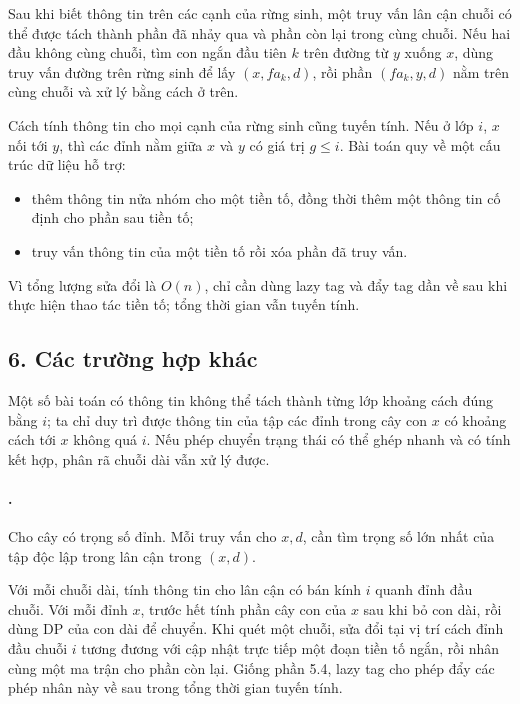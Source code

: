 \documentclass[11pt]{article}
\begin{document}
Sau khi biết thông tin trên các cạnh của rừng sinh, một truy vấn lân cận chuỗi
có thể được tách thành phần đã nhảy qua và phần còn lại trong cùng chuỗi. Nếu
hai đầu không cùng chuỗi, tìm con ngắn đầu tiên \(k\) trên đường từ \(y\) xuống
\(x\), dùng truy vấn đường trên rừng sinh để lấy \((x,fa_k,d)\), rồi phần
\((fa_k,y,d)\) nằm trên cùng chuỗi và xử lý bằng cách ở trên.

Cách tính thông tin cho mọi cạnh của rừng sinh cũng tuyến tính. Nếu ở lớp
\(i\), \(x\) nối tới \(y\), thì các đỉnh nằm giữa \(x\) và \(y\) có giá trị
\(g\le i\). Bài toán quy về một cấu trúc dữ liệu hỗ trợ:
\begin{itemize}
  \item thêm thông tin nửa nhóm cho một tiền tố, đồng thời thêm một thông tin
  cố định cho phần sau tiền tố;
  \item truy vấn thông tin của một tiền tố rồi xóa phần đã truy vấn.
\end{itemize}
Vì tổng lượng sửa đổi là \(O(n)\), chỉ cần dùng lazy tag và đẩy tag dần về sau
khi thực hiện thao tác tiền tố; tổng thời gian vẫn tuyến tính.

\subsection*{6. Các trường hợp khác}

Một số bài toán có thông tin không thể tách thành từng lớp khoảng cách đúng
bằng \(i\); ta chỉ duy trì được thông tin của tập các đỉnh trong cây con \(x\)
có khoảng cách tới \(x\) không quá \(i\). Nếu phép chuyển trạng thái có thể
ghép nhanh và có tính kết hợp, phân rã chuỗi dài vẫn xử lý được.

\paragraph{.}
Cho cây có trọng số đỉnh. Mỗi truy vấn cho \(x,d\), cần tìm trọng số lớn nhất
của tập độc lập trong lân cận trong \((x,d)\).

Với mỗi chuỗi dài, tính thông tin cho lân cận có bán kính \(i\) quanh đỉnh đầu
chuỗi. Với mỗi đỉnh \(x\), trước hết tính phần cây con của \(x\) sau khi bỏ con
dài, rồi dùng DP của con dài để chuyển. Khi quét một chuỗi, sửa đổi tại vị trí
cách đỉnh đầu chuỗi \(i\) tương đương với cập nhật trực tiếp một đoạn tiền tố
ngắn, rồi nhân cùng một ma trận cho phần còn lại. Giống phần 5.4, lazy tag cho
phép đẩy các phép nhân này về sau trong tổng thời gian tuyến tính.
\end{document}
